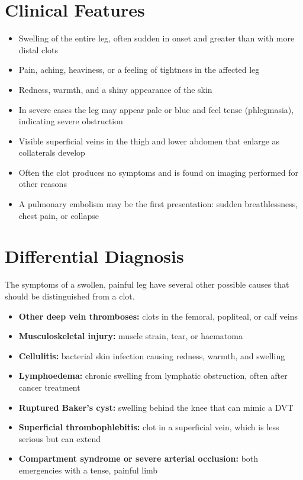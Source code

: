 \section*{Clinical Features}
\begin{itemize}
    \item Swelling of the entire leg, often sudden in onset and greater than with more distal clots
    \item Pain, aching, heaviness, or a feeling of tightness in the affected leg
    \item Redness, warmth, and a shiny appearance of the skin
    \item In severe cases the leg may appear pale or blue and feel tense (phlegmasia), indicating severe obstruction
    \item Visible superficial veins in the thigh and lower abdomen that enlarge as collaterals develop
    \item Often the clot produces no symptoms and is found on imaging performed for other reasons
    \item A pulmonary embolism may be the first presentation: sudden breathlessness, chest pain, or collapse
\end{itemize}

\section*{Differential Diagnosis}
The symptoms of a swollen, painful leg have several other possible causes that should be distinguished from a clot.
\begin{itemize}
    \item \textbf{Other deep vein thromboses:} clots in the femoral, popliteal, or calf veins
    \item \textbf{Musculoskeletal injury:} muscle strain, tear, or haematoma
    \item \textbf{Cellulitis:} bacterial skin infection causing redness, warmth, and swelling
    \item \textbf{Lymphoedema:} chronic swelling from lymphatic obstruction, often after cancer treatment
    \item \textbf{Ruptured Baker's cyst:} swelling behind the knee that can mimic a DVT
    \item \textbf{Superficial thrombophlebitis:} clot in a superficial vein, which is less serious but can extend
    \item \textbf{Compartment syndrome or severe arterial occlusion:} both emergencies with a tense, painful limb
\end{itemize}

